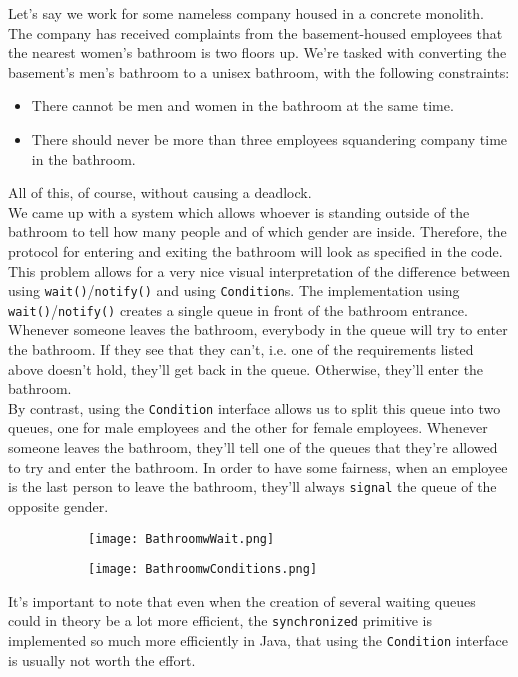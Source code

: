 \documentclass[main]{subfiles}
\begin{document}
\begin{example}
    Let's say we work for some nameless company housed in a concrete monolith. The company has received complaints from the basement-housed employees that the nearest women's bathroom is two floors up. We're tasked with converting the basement's men's bathroom to a unisex bathroom, with the following constraints:
    \begin{itemize}
        \item There cannot be men and women in the bathroom at the same time.
        \item There should never be more than three employees squandering company time in the bathroom.
    \end{itemize}
    All of this, of course, without causing a deadlock.\\
    We came up with a system which allows whoever is standing outside of the bathroom to tell how many people and of which gender are inside. Therefore, the protocol for entering and exiting the bathroom will look as specified in the code.\\[3mm]
    This problem allows for a very nice visual interpretation of the difference between using \texttt{wait()}/\texttt{notify()} and using \texttt{Condition}s. The implementation using \texttt{wait()}/\texttt{notify()} creates a single queue in front of the bathroom entrance. Whenever someone leaves the bathroom, everybody in the queue will try to enter the bathroom. If they see that they can't, i.e. one of the requirements listed above doesn't hold, they'll get back in the queue. Otherwise, they'll enter the bathroom.\\[3mm]
    By contrast, using the \texttt{Condition} interface allows us to split this queue into two queues, one for male employees and the other for female employees. Whenever someone leaves the bathroom, they'll tell one of the queues that they're allowed to try and enter the bathroom. In order to have some fairness, when an employee is the last person to leave the bathroom, they'll always \texttt{signal} the queue of the opposite gender.
    \begin{figure}[H]
        \centering
        \begin{subfigure}{.5\textwidth}
            \centering
            \texttt{[image: BathroomwWait.png]}
        \end{subfigure}%
        \begin{subfigure}{.5\textwidth}
            \centering
            \texttt{[image: BathroomwConditions.png]}
        \end{subfigure}
    \end{figure}
\end{example}
It's important to note that even when the creation of several waiting queues could in theory be a lot more efficient, the \texttt{synchronized} primitive is implemented so much more efficiently in Java, that using the \texttt{Condition} interface is usually not worth the effort.
\end{document}
